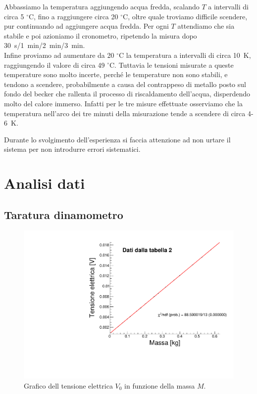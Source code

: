 \documentclass[italian, a4paper, 10pt, twocolumn]{../../style/lab_unige}
\begin{document}
    
    Abbassiamo la temperatura aggiungendo acqua fredda, scalando $T$ a intervalli di circa 5 $^\circ$C, fino a raggiungere circa 20 $^\circ$C, oltre quale troviamo difficile scendere, pur continuando ad aggiungere acqua fredda. Per ogni $T$ attendiamo che sia stabile e poi azioniamo il cronometro, ripetendo la misura dopo 30~s/1~min/2~min/3~min.\\
    Infine proviamo ad aumentare da 20 $^\circ$C la temperatura a intervalli di circa 10~K, raggiungendo il valore di circa 49 $^\circ$C. Tuttavia le tensioni misurate a queste temperature sono molto incerte, perché le temperature non sono stabili, e tendono a scendere, probabilmente a causa del contrappeso di metallo posto sul fondo del becker che rallenta il processo di riscaldamento dell'acqua, disperdendo molto del calore immerso. Infatti per le tre misure effettuate osserviamo che la temperatura nell'arco dei tre minuti della misurazione tende a scendere di circa 4-6~K.
    
    Durante lo svolgimento dell’esperienza si faccia attenzione ad non urtare il sistema per non introdurre errori sistematici.

    \section{Analisi dati}
    \label{section:analysis}

    \subsection{Taratura dinamometro}

    \begin{figure}
        \centering
        \includegraphics[width=\linewidth]{tar_plot.pdf}
        \caption{Grafico dell tensione elettrica $V_0$ in funzione della massa $M$.}
        \label{figure:tar_plot}
    \end{figure}
\end{document}
